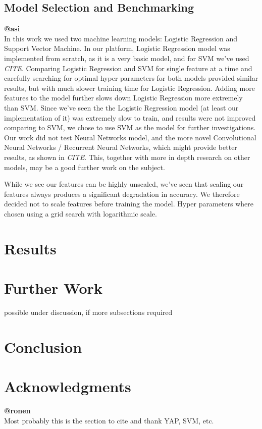 \documentclass[a4paper]{article}
\begin{document}
\subsection{Model Selection and Benchmarking}
\textbf{@asi}\\
In this work we used two machine learning models: Logistic Regression and Support Vector Machine.
In our platform, Logistic Regression model was implemented from scratch, as it is a very basic model, and for SVM we've used \emph{CITE}.
Comparing Logistic Regression and SVM for single feature at a time and carefully searching for optimal hyper parameters for both models provided similar results, but with much slower training time for Logistic Regression.
Adding more features to the model further slows down Logistic Regression more extremely than SVM.
Since we've seen the the Logistic Regression model (at least our implementation of it) was extremely slow to train, and results were not improved comparing to SVM, we chose to use SVM as the model for further investigations.
Our work did not test Neural Networks model, and the more novel Convolutional Neural Networks / Recurrent Neural Networks, which might provide better results, as shown in \emph{CITE}. This, together with more in depth research on other models, may be a good further work on the subject.

While we see our features can be highly unscaled, we've seen that scaling our features always produces a significant degradation in accuracy.
We therefore decided not to scale features before training the model.
Hyper parameters where chosen using a grid search with logarithmic scale.
\section{Results}
\label{Results}
\section{Further Work}
\label{Further Work}
possible under discussion, if more subsections required
\section{Conclusion}
\label{Conclusion}
\section{Acknowledgments}
\label{Acknowledgments}
\textbf{@ronen}\\
Most probably this is the section to cite and thank YAP, SVM, etc.
\end{document}

